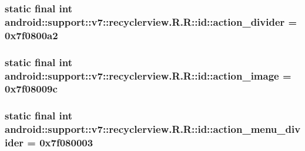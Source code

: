 \hypertarget{classandroid_1_1support_1_1v7_1_1recyclerview_1_1_r_1_1id_1eca7f20ef16d20eea8a2c54b44585c7}{
\subsubsection[{action\_\-divider}]{\setlength{\rightskip}{0pt plus 5cm}static final int android::support::v7::recyclerview.R.R::id::action\_\-divider = 0x7f0800a2}}
\label{classandroid_1_1support_1_1v7_1_1recyclerview_1_1_r_1_1id_1eca7f20ef16d20eea8a2c54b44585c7}


\hypertarget{classandroid_1_1support_1_1v7_1_1recyclerview_1_1_r_1_1id_e554b93cf9282cff9e6331c3cf4a4f62}{
\subsubsection[{action\_\-image}]{\setlength{\rightskip}{0pt plus 5cm}static final int android::support::v7::recyclerview.R.R::id::action\_\-image = 0x7f08009c}}
\label{classandroid_1_1support_1_1v7_1_1recyclerview_1_1_r_1_1id_e554b93cf9282cff9e6331c3cf4a4f62}


\hypertarget{classandroid_1_1support_1_1v7_1_1recyclerview_1_1_r_1_1id_e787073c964985b97a356b895d3470a0}{
\subsubsection[{action\_\-menu\_\-divider}]{\setlength{\rightskip}{0pt plus 5cm}static final int android::support::v7::recyclerview.R.R::id::action\_\-menu\_\-divider = 0x7f080003}}
\label{classandroid_1_1support_1_1v7_1_1recyclerview_1_1_r_1_1id_e787073c964985b97a356b895d3470a0}


